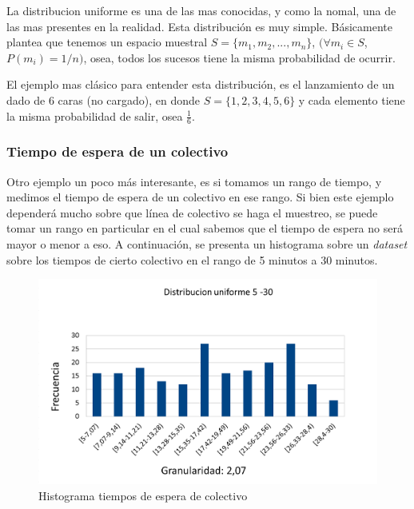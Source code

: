 	La distribucion uniforme es una de las mas conocidas, y como la nomal, una de las mas presentes en la realidad.
	Esta distribuci\'on es muy simple. B\'asicamente plantea que tenemos un espacio muestral $S=\{m_1, m_2, ... ,m_n\}$, $(\forall m_i \in S$,  $P(m_i)=1/n)$, osea, todos los sucesos tiene la misma probabilidad de ocurrir. 
			
	El ejemplo mas cl\'asico para entender esta distribuci\'on, es el lanzamiento de un dado de 6 caras (no cargado), en donde $S = \{1, 2, 3, 4, 5, 6\}$ y cada elemento tiene la misma probabilidad de salir, osea $ \frac{1}{6} $.
			
\subsubsection*{Tiempo de espera de un colectivo}

	Otro ejemplo un poco m\'as interesante, es si tomamos un rango de tiempo, y medimos el tiempo de espera de un colectivo en ese rango. Si bien este ejemplo depender\'a mucho sobre que l\'inea de colectivo se haga el muestreo, se puede tomar un rango en particular en el cual sabemos que el tiempo de espera no ser\'a mayor o menor a eso. A continuaci\'on, se presenta un histograma sobre un \textit{dataset} sobre los tiempos de cierto colectivo en el rango de 5 minutos a 30 minutos.
		
	\begin{figure}[H]
	  \begin{center}
	    \includegraphics[scale=.40]{imagenes/uniforme_ejemplo.png}
	    \caption{Histograma tiempos de espera de colectivo} 
	    \label{fig:normal_ejemplo1}
	  \end{center}
	\end{figure}